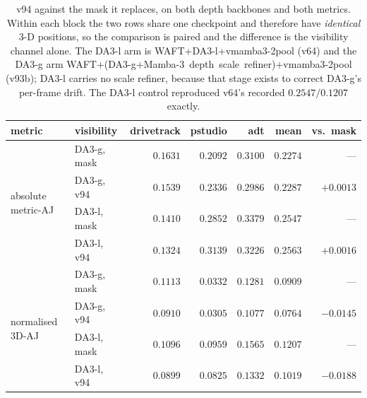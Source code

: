 \documentclass[11pt,a4paper]{article}
\begin{document}
\begin{table}[h]
\centering
\caption{v94 against the mask it replaces, on both depth backbones and both metrics. Within each
block the two rows share one checkpoint and therefore have \emph{identical} 3-D positions, so the
comparison is paired and the difference is the visibility channel alone. The DA3-l arm is
\mbox{WAFT+DA3-l+vmamba3-2pool} (v64) and the DA3-g arm
\mbox{WAFT+(DA3-g+Mamba-3 depth scale refiner)+vmamba3-2pool} (v93b); DA3-l carries no scale
refiner, because that stage exists to correct DA3-g's per-frame drift. The DA3-l control reproduced v64's recorded
$0.2547 / 0.1207$ exactly.}
\label{tab:v94-result}
\begin{tabular}{llrrrrr}
\toprule
metric & visibility & drivetrack & pstudio & adt & mean & vs.\ mask \\
\midrule
\multirow{4}{*}{absolute metric-AJ}
 & DA3-g, mask & $0.1631$ & $0.2092$ & $0.3100$ & $0.2274$ & --- \\
 & DA3-g, v94  & $0.1539$ & $0.2336$ & $0.2986$ & $0.2287$ & $+0.0013$ \\
 & DA3-l, mask & $0.1410$ & $0.2852$ & $\mathbf{0.3379}$ & $0.2547$ & --- \\
 & DA3-l, v94  & $0.1324$ & $\mathbf{0.3139}$ & $0.3226$ & $\mathbf{0.2563}$ & $+0.0016$ \\
\midrule
\multirow{4}{*}{normalised 3D-AJ}
 & DA3-g, mask & $0.1113$ & $0.0332$ & $0.1281$ & $0.0909$ & --- \\
 & DA3-g, v94  & $0.0910$ & $0.0305$ & $0.1077$ & $0.0764$ & $-0.0145$ \\
 & DA3-l, mask & $0.1096$ & $0.0959$ & $\mathbf{0.1565}$ & $\mathbf{0.1207}$ & --- \\
 & DA3-l, v94  & $0.0899$ & $0.0825$ & $0.1332$ & $0.1019$ & $-0.0188$ \\
\bottomrule
\end{tabular}
\end{table}
\end{document}

